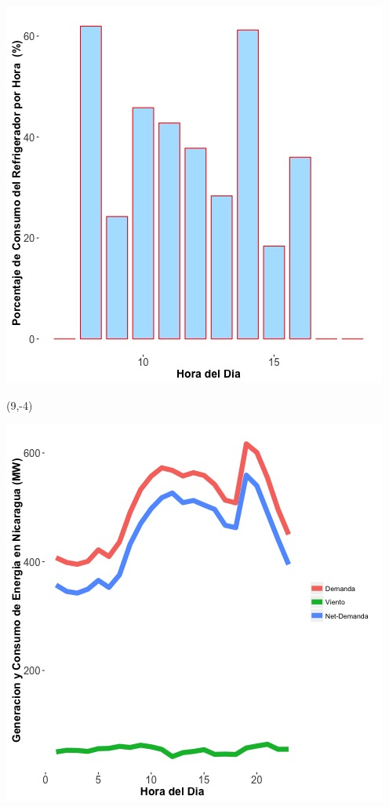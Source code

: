 \documentclass{article}\usepackage[]{graphicx}\usepackage[]{color}
\newenvironment{knitrout}{}{} %
\begin{document}
\begin{knitrout}
\color{fgcolor}
\includegraphics[scale=0.65]{figure/A6_fridge_energy_pct.jpg} 
\end{knitrout}

 \begin{textblock}{1}(9,-4)
\begin{minipage}{20em}
\begingroup

\endgroup
\end{minipage}
\end{textblock}

\vspace{20cm}
 

\begin{knitrout}
\color{fgcolor}
\includegraphics[scale=0.65]{figure/gridplot1.jpg} 
\end{knitrout}
\end{document}
